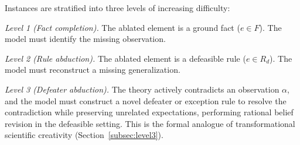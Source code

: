 \documentclass{article}
\theoremstyle{definition}
\newcommand{\Rd}{R_d}
\begin{document}
Instances are stratified into three levels of increasing difficulty:

\textit{Level 1 (Fact completion).} The ablated element is a ground fact ($e \in F$). The model must identify the missing observation.

\textit{Level 2 (Rule abduction).} The ablated element is a defeasible rule ($e \in \Rd$). The model must reconstruct a missing generalization.

\textit{Level 3 (Defeater abduction).} The theory actively contradicts an observation $\alpha$, and the model must construct a novel defeater or exception rule to resolve the contradiction while preserving unrelated expectations, performing rational belief revision in the defeasible setting. This is the formal analogue of transformational scientific creativity (Section~\ref{subsec:level3}).
\end{document}
